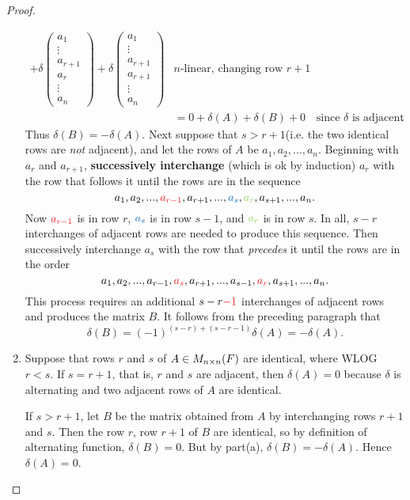 \begin{proof}
\begin{enumerate}
\begin{align*}
        + \delta\left(\begin{array}{c} a_{1} \\ \vdots \\ a_{r+1} \\ a_{r} \\ \vdots \\ a_{n} \end{array}\right)
        + \delta\left(\begin{array}{c} a_{1} \\ \vdots \\ a_{r+1} \\ a_{r+1} \\ \vdots \\ a_{n} \end{array}\right) & \text{\(n\)-linear, changing row \(r+1\)} \\
      & = 0 + \delta(A) + \delta(B) + 0 & \text{since \(\delta\) is adjacent}.
\end{align*}
Thus \(\delta(B) = -\delta(A)\).
Next suppose that \(s > r + 1\)(i.e. the two identical rows are \emph{not} adjacent),
and let the rows of \(A\) be \(a_1, a_2, ..., a_n\).
Beginning with \(a_r\) and \(a_{r + 1}\), \textbf{successively interchange} (which is ok by induction) \(a_r\) with the row that follows it until the rows are in the sequence
\[
    a_1, a_2, ..., \RED{a_{r - 1}}, a_{r + 1}, ..., \BLUE{a_s}, \GREEN{a_r}, a_{s + 1}, ..., a_n.
\]
Now \(\RED{a_{r - 1}}\) is in row \(r\), \(\BLUE{a_s}\) is in row \(s - 1\), and \(\GREEN{a_r}\) is in row \(s\).
In all, \(s - r\) interchanges of adjacent rows are needed to produce this sequence.
Then successively interchange \(a_s\) with the row that \emph{precedes} it until the rows
are in the order
\[
    a_1, a_2, ..., a_{r-1}, \RED{a_s}, a_{r + 1}, ..., a_{s-1}, \RED{a_r}, a_{s+1}, ..., a_n.
\]
This process requires an additional \(s - r \RED{- 1}\) interchanges of adjacent rows and produces the matrix \(B\).
It follows from the preceding paragraph that
\[
    \delta(B) = (-1)^{(s-r)+(s-r-1)}\delta(A) = -\delta(A).
\]

\item Suppose that rows \(r\) and \(s\) of \(A \in M_{n \times n}(F)\) are identical, where WLOG \(r < s\).
If \(s = r + 1\), that is, \(r\) and \(s\) are adjacent, then \(\delta(A) = 0\) because \(\delta\) is alternating and two adjacent rows of \(A\) are identical.

If \(s > r + 1\), let \(B\) be the matrix obtained from \(A\) by interchanging rows \(r + 1\) and \(s\).
Then the row \(r\), row \(r+1\) of \(B\) are identical, so by definition of alternating function, \(\delta(B) = 0\).
But by part(a), \(\delta(B ) = -\delta(A)\). Hence \(\delta(A) = 0\).
\end{enumerate}
\end{proof}

